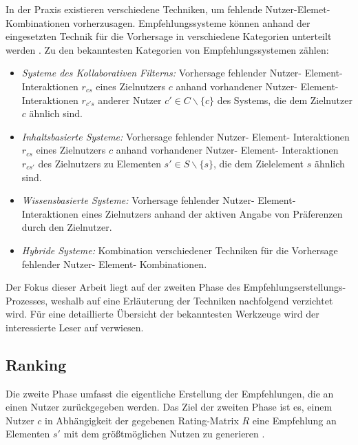 In der Praxis existieren verschiedene Techniken, um fehlende Nutzer-Elemet-Kombinationen vorherzusagen.
Empfehlungssysteme können anhand der eingesetzten Technik für die Vorhersage in verschiedene Kategorien unterteilt werden \cite[S. 8 ff]{recommenderSystems:2016}.
Zu den bekanntesten Kategorien von Empfehlungssystemen zählen:
\begin{itemize}%
	\item \textit{Systeme des Kollaborativen Filterns:} Vorhersage fehlender Nutzer- Element- Interaktionen $r_{cs}$ eines Zielnutzers $c$ anhand vorhandener Nutzer- Element- Interaktionen $r_{c's}$ anderer Nutzer $c' \in C \backslash \{c\}$ des Systems, die dem Zielnutzer $c$ ähnlich sind.
	\item \textit{Inhaltsbasierte Systeme:} Vorhersage fehlender Nutzer- Element- Interaktionen $r_{cs}$ eines Zielnutzers $c$ anhand vorhandener Nutzer- Element- Interaktionen $r_{cs'}$ des Zielnutzers zu Elementen $s' \in S \backslash \{s\}$, die dem Zielelement $s$ ähnlich sind.
	\item \textit{Wissensbasierte Systeme:} Vorhersage fehlender Nutzer- Element- Interaktionen eines Zielnutzers anhand der aktiven Angabe von Präferenzen durch den Zielnutzer.
	\item \textit{Hybride Systeme:} Kombination verschiedener Techniken für die Vorhersage fehlender Nutzer- Element- Kombinationen.
\end{itemize}

Der Fokus dieser Arbeit liegt auf der zweiten Phase des Empfehlungserstellungs-Prozesses, weshalb auf eine Erläuterung der Techniken nachfolgend verzichtet wird.
Für eine detaillierte Übersicht der bekanntesten Werkzeuge wird der interessierte Leser auf \textcite[S. 8ff]{recommenderSystems:2016} verwiesen.

\subsection{Ranking}
\label{ch:empfehlungssysteme:empfehlungserstellung:recommendation}
Die zweite Phase umfasst die eigentliche Erstellung der Empfehlungen, die an einen Nutzer zurückgegeben werden.
Das Ziel der zweiten Phase ist es, einem Nutzer $c$ in Abhängigkeit der gegebenen Rating-Matrix $R$ eine Empfehlung an Elementen $s'$ mit dem größtmöglichen Nutzen zu generieren \cite[S. 6]{ekstrand:article}.

